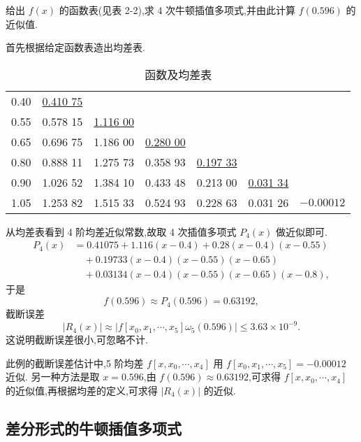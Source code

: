 \documentclass[../../main.tex]{subfiles}
\begin{document}
\begin{example}
给出 $f(x)$ 的函数表(见表 2-2),求 4 次牛顿插值多项式,并由此计算 $f(0.596)$ 的近似值.
\end{example}
\begin{solution}
首先根据给定函数表造出均差表.
\begin{table}[H]
\centering
\caption{函数及均差表}
\label{table:例题1均差表}
\begin{tabular}{c|c|c|c|c|c|c}
\hline
0.40  & \underline{0.410 75} &          &          &          &          &          \\
0.55  & 0.578 15          & \underline{1.116 00} &          &          &          &          \\
0.65  & 0.696 75          & 1.186 00          & \underline{0.280 00} &          &          &          \\
0.80  & 0.888 11          & 1.275 73          & 0.358 93          & \underline{0.197 33} &          &          \\
0.90  & 1.026 52          & 1.384 10          & 0.433 48          & 0.213 00          & \underline{0.031 34} &          \\
1.05  & 1.253 82          & 1.515 33          & 0.524 93          & 0.228 63          & 0.031 26          & $-0.000 12$ \\
\hline
\end{tabular}
\end{table}
从均差表看到 4 阶均差近似常数,故取 4 次插值多项式 $P_4(x)$ 做近似即可.
\begin{align*}
P_4(x) &= 0.41075 + 1.116(x - 0.4) + 0.28(x - 0.4)(x - 0.55) \\
&\quad + 0.19733(x - 0.4)(x - 0.55)(x - 0.65) \\
&\quad + 0.03134(x - 0.4)(x - 0.55)(x - 0.65)(x - 0.8),
\end{align*}
于是
\[
f(0.596) \approx P_4(0.596) = 0.63192,
\]
截断误差
\[
|R_4(x)| \approx |f[x_0, x_1, \cdots, x_5]\omega_5(0.596)| \leqslant 3.63 \times 10^{-9}.
\]
这说明截断误差很小,可忽略不计.

此例的截断误差估计中,5 阶均差 $f[x, x_0, \cdots, x_4]$ 用 $f[x_0, x_1, \cdots, x_5] = -0.00012$ 近似. 另一种方法是取 $x = 0.596$,由 $f(0.596) \approx 0.63192$,可求得 $f[x, x_0, \cdots, x_4]$ 的近似值,再根据均差的定义,可求得 $|R_4(x)|$ 的近似.
\end{solution}


\subsection{差分形式的牛顿插值多项式}
\end{document}
